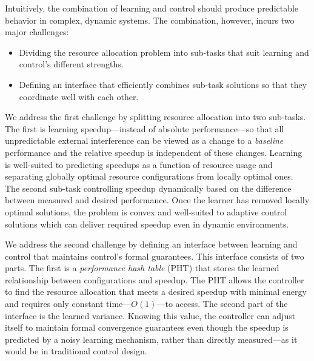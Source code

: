 Intuitively, the combination of learning and control should produce
predictable behavior in complex, dynamic systems.  The combination,
however, incurs two major challenges:
\begin{itemize}[leftmargin=1em]
\item Dividing the resource allocation problem into sub-tasks that
  suit learning and control's different strengths.
\item Defining an interface that efficiently combines sub-task
  solutions so that they coordinate well with each other.
\end{itemize}

We address the first challenge by splitting resource allocation into
two sub-tasks.  The first is learning speedup---instead of absolute
performance---so that all unpredictable external interference can be
viewed as a change to a \emph{baseline} performance and the relative
speedup is independent of these changes.  Learning is well-suited to
predicting speedups as a function of resource usage and separating
globally optimal resource configurations from locally optimal ones.
The second sub-task controlling speedup dynamically based on the
difference between measured and desired performance.  Once the learner
has removed locally optimal solutions, the problem is convex and
well-suited to adaptive control solutions which can deliver required
speedup even in dynamic environments.

We address the second challenge by defining an interface between
learning and control that maintains control's formal guarantees.  This
interface consists of two parts.  The first is a \emph{performance
  hash table} (PHT) that stores the learned relationship between
configurations and speedup.  The PHT allows the controller to find the
resource allocation that meets a desired speedup with minimal energy
and requires only constant time---$O(1)$---to access.  The second part
of the interface is the learned variance.  Knowing this value, the
controller can adjust itself to maintain formal convergence guarantees
even though the speedup is predicted by a noisy learning mechanism,
rather than directly measured---as it would be in traditional control
design.


